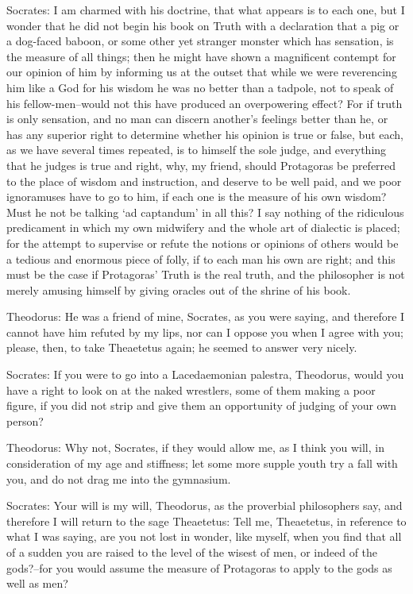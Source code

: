 Socrates: I am charmed with his doctrine, that what appears is to
each one, but I wonder that he did not begin his book on Truth with a
declaration that a pig or a dog-faced baboon, or some other yet stranger
monster which has sensation, is the measure of all things; then he might
have shown a magnificent contempt for our opinion of him by informing
us at the outset that while we were reverencing him like a God for
his wisdom he was no better than a tadpole, not to speak of his
fellow-men--would not this have produced an overpowering effect? For
if truth is only sensation, and no man can discern another's feelings
better than he, or has any superior right to determine whether his
opinion is true or false, but each, as we have several times repeated,
is to himself the sole judge, and everything that he judges is true and
right, why, my friend, should Protagoras be preferred to the place
of wisdom and instruction, and deserve to be well paid, and we poor
ignoramuses have to go to him, if each one is the measure of his own
wisdom? Must he not be talking `ad captandum' in all this? I say nothing
of the ridiculous predicament in which my own midwifery and the whole
art of dialectic is placed; for the attempt to supervise or refute the
notions or opinions of others would be a tedious and enormous piece of
folly, if to each man his own are right; and this must be the case if
Protagoras' Truth is the real truth, and the philosopher is not merely
amusing himself by giving oracles out of the shrine of his book.

Theodorus: He was a friend of mine, Socrates, as you were saying, and
therefore I cannot have him refuted by my lips, nor can I oppose you
when I agree with you; please, then, to take Theaetetus again; he seemed
to answer very nicely.

Socrates: If you were to go into a Lacedaemonian palestra, Theodorus,
would you have a right to look on at the naked wrestlers, some of them
making a poor figure, if you did not strip and give them an opportunity
of judging of your own person?

Theodorus: Why not, Socrates, if they would allow me, as I think you
will, in consideration of my age and stiffness; let some more supple
youth try a fall with you, and do not drag me into the gymnasium.

Socrates: Your will is my will, Theodorus, as the proverbial
philosophers say, and therefore I will return to the sage Theaetetus:
Tell me, Theaetetus, in reference to what I was saying, are you not
lost in wonder, like myself, when you find that all of a sudden you are
raised to the level of the wisest of men, or indeed of the gods?--for
you would assume the measure of Protagoras to apply to the gods as well
as men?

